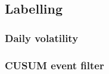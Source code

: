 \documentclass[12pt,a4paper,oneside]{article}
\begin{document}
\subsection{Labelling}\label{subsec:labeling}



\subsubsection{Daily volatility}\label{subsubsec:vol}

%


\subsubsection{CUSUM event filter}\label{subsubsec:cusum}

%
\end{document}
